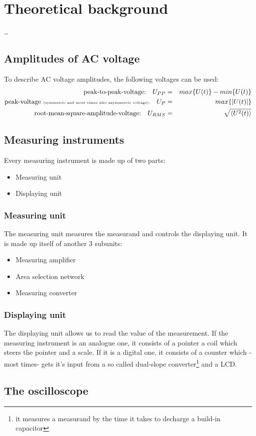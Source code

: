 \section{Theoretical background}
…\subsection{Amplitudes of AC voltage}
To describe AC voltage amplitudes, the following voltages can be used:
\begin{eqnarray*}
	\text{peak-to-peak-voltage:}\quad U_{PP}&=&max\{U(t)\}-min\{U(t)\}\\
	\text{peak-voltage \tiny{(symmetric and most times also asymmetric voltage)}:}\quad U_P&=&max\{|U(t)|\}\\
	\text{root-mean-square-amplitude-voltage:}\quad U_{RMS}&=&\sqrt{\left<U^2(t)\right>}
\end{eqnarray*}
\subsection{Measuring instruments}
Every measuring instrument is made up of two parts:
\begin{itemize}
	\item{Measuring unit}
	\item{Displaying unit}
\end{itemize}
\subsubsection{Measuring unit}
The measuring unit measures the measurand and controls the displaying unit. It is made up itself of another 3 subunits:
\begin{itemize}
	\item{Measuring amplifier}
	\item{Area selection network}
	\item{Measuring converter}
\end{itemize}
\subsubsection{Displaying unit}
The displaying unit allows us to read the value of the measurement. If the measuring instrument is an analogue one, it consists of a pointer a coil which steers the pointer and a scale. If it is a digital one, it consists of a counter which -most times- gets it's input from a so called dual-slope converter\footnote{it measures a measurand by the time it takes to decharge a build-in capacitor} and a LCD.
\subsection{The oscilloscope}

